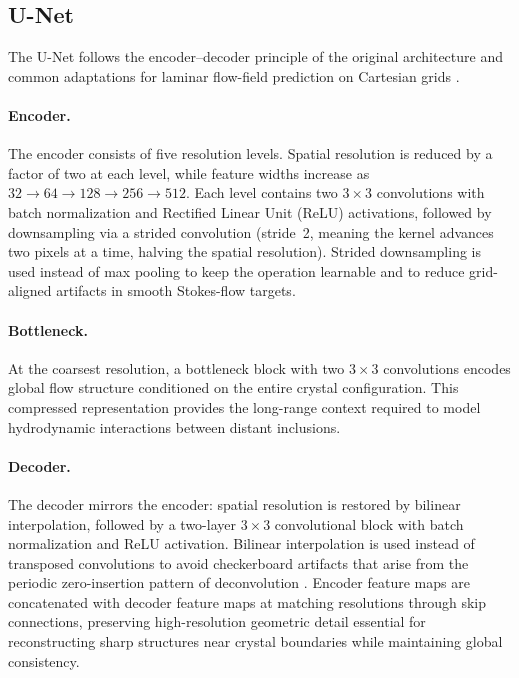 \subsection{U-Net}
\label{sec:unet_architecture}

The U-Net follows the encoder--decoder principle of the original architecture \parencite{ronneberger_u-net_2015} and common adaptations for laminar flow-field prediction on Cartesian grids \parencite{thuerey_deep_2020,chen_u-net_nodate}.

\paragraph{Encoder.}
The encoder consists of five resolution levels. Spatial resolution is reduced by a factor of two at each level, while feature widths increase as $32 \rightarrow 64 \rightarrow 128 \rightarrow 256 \rightarrow 512$. Each level contains two
$3\times3$ convolutions with batch normalization \parencite{ioffe2015batchnormalizationacceleratingdeep} and Rectified Linear Unit (ReLU) activations, followed by downsampling via a strided convolution (stride~2, meaning the kernel advances two pixels at a time, halving the spatial resolution). Strided downsampling is used instead of max pooling to keep the operation learnable and to reduce grid-aligned artifacts in smooth Stokes-flow targets.

\paragraph{Bottleneck.}
At the coarsest resolution, a bottleneck block with two $3\times3$ convolutions encodes global flow structure conditioned on the entire crystal configuration. This compressed representation provides the long-range context required to model hydrodynamic interactions between distant inclusions.

\paragraph{Decoder.}
The decoder mirrors the encoder: spatial resolution is restored by bilinear interpolation, followed by a two-layer $3\times3$ convolutional block with batch normalization and ReLU activation. Bilinear interpolation is used instead of transposed convolutions to avoid checkerboard artifacts that arise from the periodic zero-insertion pattern of deconvolution \parencite{odena_deconvolution_2016}. Encoder feature maps are concatenated with decoder feature maps at matching resolutions through skip connections, preserving high-resolution geometric detail essential for reconstructing sharp structures near crystal boundaries while maintaining global consistency.

